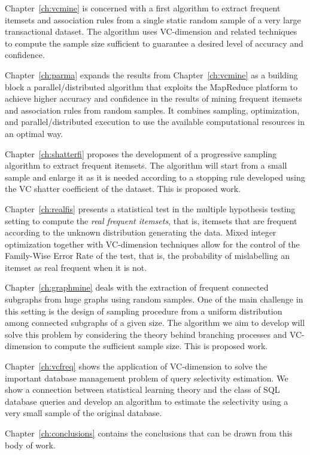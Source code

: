 Chapter~\ref{ch:vcmine} is concerned with a first algorithm to extract frequent itemsets
and association rules from a single static random sample of a very large
transactional dataset. The algorithm uses VC-dimension and related techniques to
compute the sample size sufficient to guarantee a desired level of accuracy and
confidence.

Chapter~\ref{ch:parma} expands the results from
Chapter~\ref{ch:vcmine} as a building block a parallel/distributed algorithm
that exploits the MapReduce platform to achieve higher accuracy and confidence
in the results of mining frequent itemsets and association rules from random
samples. It combines sampling, optimization, and parallel/distributed execution
to use the available computational resources in an optimal way.

Chapter~\ref{ch:shatterfi} proposes the development of a progressive sampling
algorithm to extract frequent itemsets. The algorithm will start from a small
sample and enlarge it as it is needed according to a stopping rule developed
using the VC shatter coefficient of the dataset. This is proposed work.

Chapter~\ref{ch:realfis} presents a statistical test in the multiple hypothesis
testing setting to compute the \emph{real frequent itemsets}, that is, itemsets
that are frequent according to the unknown distribution generating the data.
Mixed integer optimization together with VC-dimension techniques allow for the
control of the Family-Wise Error Rate of the test, that is, the probability of
mislabelling an itemset as real frequent when it is not.

Chapter~\ref{ch:graphmine} deals with the extraction of frequent connected
subgraphs from huge graphs using random samples. One of the main challenge in
this setting is the design of sampling procedure from a uniform
distribution among connected subgraphs of a given size. The algorithm we aim to
develop will solve this problem by considering the theory behind branching
processes and VC-dimension to compute the sufficient sample size. This is
proposed work.

Chapter~\ref{ch:vcfreq} shows the application of VC-dimension to solve the
important database management problem of query selectivity estimation. We show a
connection between statistical learning theory and the class of SQL database
queries and develop an algorithm to estimate the selectivity using a very small
sample of the original database.

Chapter~\ref{ch:conclusions} contains the conclusions that can be drawn from
this body of work.


